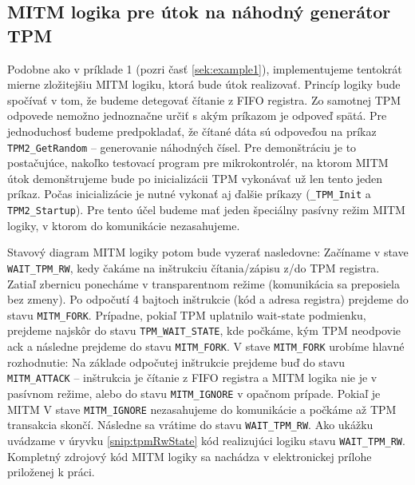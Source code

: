 \subsection{MITM logika pre útok na náhodný generátor TPM}
Podobne ako v príklade 1 (pozri časť \ref{sek:example1}), implementujeme tentokrát mierne zložitejšiu MITM logiku, ktorá bude útok realizovať. Princíp logiky bude spočívať v tom, že budeme detegovať čítanie z FIFO registra. Zo samotnej TPM odpovede nemožno jednoznačne určiť s akým príkazom je odpoveď spätá. Pre jednoduchosť budeme predpokladať, že čítané dáta sú odpoveďou na príkaz \texttt{TPM2\_GetRandom} -- generovanie náhodných čísel. Pre demonštráciu je to postačujúce, nakoľko testovací program pre mikrokontrolér, na ktorom MITM útok demonštrujeme bude po inicializácii TPM vykonávať už len tento jeden príkaz. Počas inicializácie je nutné vykonať aj ďalšie príkazy (\texttt{\_TPM\_Init} a \texttt{TPM2\_Startup}). Pre tento účel budeme mať jeden špeciálny pasívny režim MITM logiky, v ktorom do komunikácie nezasahujeme.

Stavový diagram MITM logiky potom bude vyzerať nasledovne: Začíname v stave \texttt{WAIT\_TPM\_RW}, kedy čakáme na inštrukciu čítania/zápisu z/do TPM registra. Zatiaľ zbernicu ponecháme v transparentnom režime (komunikácia sa preposiela bez zmeny). Po odpočutí 4 bajtoch inštrukcie (kód a adresa registra) prejdeme do stavu \texttt{MITM\_FORK}. Prípadne, pokiaľ TPM uplatnilo wait-state podmienku, prejdeme najskôr do stavu \texttt{TPM\_WAIT\_STATE}, kde počkáme, kým TPM neodpovie ack a následne prejdeme do stavu \texttt{MITM\_FORK}. V stave \texttt{MITM\_FORK} urobíme hlavné rozhodnutie: Na základe odpočutej inštrukcie prejdeme buď do stavu \texttt{MITM\_ATTACK} -- inštrukcia je čítanie z FIFO registra a MITM logika nie je v pasívnom režime, alebo do stavu \texttt{MITM\_IGNORE} v opačnom prípade. Pokiaľ je MITM V stave \texttt{MITM\_IGNORE} nezasahujeme do komunikácie a počkáme až TPM transakcia skončí. Následne sa vrátime do stavu \texttt{WAIT\_TPM\_RW}. Ako ukážku uvádzame v úryvku \ref{snip:tpmRwState} kód realizujúci logiku stavu \texttt{WAIT\_TPM\_RW}. Kompletný zdrojový kód MITM logiky sa nachádza v elektronickej prílohe priloženej k práci.

